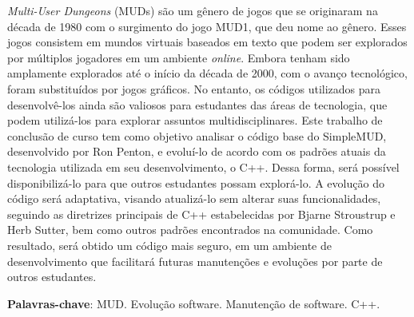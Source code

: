 \begin{resumo}
    \textit{Multi-User Dungeons} (MUDs) são um gênero de jogos que se originaram na década de 1980 com 
    o surgimento do jogo MUD1, que deu nome ao gênero. Esses jogos consistem em mundos virtuais baseados 
    em texto que podem ser explorados por múltiplos jogadores em um ambiente \textit{online}. Embora 
    tenham sido amplamente explorados até o início da década de 2000, com o avanço tecnológico, foram 
    substituídos por jogos gráficos. No entanto, os códigos utilizados para desenvolvê-los ainda são 
    valiosos para estudantes das áreas de tecnologia, que podem utilizá-los para explorar assuntos 
    multidisciplinares. Este trabalho de conclusão de curso tem como objetivo analisar o código base do 
    SimpleMUD, desenvolvido por Ron Penton, e evoluí-lo de acordo com os padrões atuais da tecnologia 
    utilizada em seu desenvolvimento, o C++. Dessa forma, será possível disponibilizá-lo para que outros 
    estudantes possam explorá-lo. A evolução do código será adaptativa, visando atualizá-lo sem alterar 
    suas funcionalidades, seguindo as diretrizes principais de C++ estabelecidas por Bjarne Stroustrup e 
    Herb Sutter, bem como outros padrões encontrados na comunidade. Como resultado, será obtido um código 
    mais seguro, em um ambiente de desenvolvimento que facilitará futuras manutenções e evoluções por 
    parte de outros estudantes.

    \vspace{\onelineskip}
    
    \noindent
    \textbf{Palavras-chave}: MUD. Evolução software. Manutenção de software. C++.
\end{resumo}

